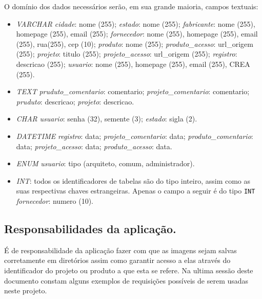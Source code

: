 \documentclass[12pt,a4paper]{article}
\begin{document}
\newpage

O domínio dos dados necessários serão, em sua grande maioria, campos textuais:

\begin{itemize}
\item \emph{VARCHAR}
\subitem \emph{cidade}: nome (255);
\subitem \emph{estado}: nome (255);
\subitem \emph{fabricante}: nome (255), homepage (255), email (255);
\subitem \emph{fornecedor}: nome (255), homepage (255), email (255), rua(255), cep (10);
\subitem \emph{produto}: nome (255);
\subitem \emph{produto\_acesso}: url\_origem (255);
\subitem \emph{projeto}: titulo (255);
\subitem \emph{projeto\_acesso}: url\_origem (255);
\subitem \emph{registro}: descricao (255);
\subitem \emph{usuario}: nome (255), homepage (255), email (255), CREA (255).
\item \emph{TEXT}
\subitem \emph{pruduto\_comentario}: comentario;
\subitem \emph{projeto\_comentario}: comentario;
\subitem \emph{pruduto}: descricao;
\subitem \emph{projeto}: descricao.
\item \emph{CHAR}
\subitem \emph{usuario}: senha (32), semente (3);
\subitem \emph{estado}: sigla (2).
\item \emph{DATETIME}
\subitem \emph{registro}: data;
\subitem \emph{projeto\_comentario}: data;
\subitem \emph{produto\_comentario}: data;
\subitem \emph{projeto\_acesso}: data;
\subitem \emph{produto\_acesso}: data.
\item \emph{ENUM}
\subitem \emph{usuario}: tipo (arquiteto, comum, administrador).
\item \emph{INT}: todos os identificadores de tabelas são do tipo inteiro, assim como as suas respectivas chaves estrangeiras. Apenas o campo a seguir é do tipo \verb+INT+
\subitem \emph{fornecedor}: numero (10).
\end{itemize}

\subsection{Responsabilidades da aplicação.}

É de responsabilidade da aplicação fazer com que as imagens sejam salvas corretamente em diretórios assim como garantir acesso a elas através do identificador do projeto ou produto a que esta se refere. Na ultima sessão deste documento constam alguns exemplos de requisições possíveis de serem usadas neste projeto.
\end{document}
